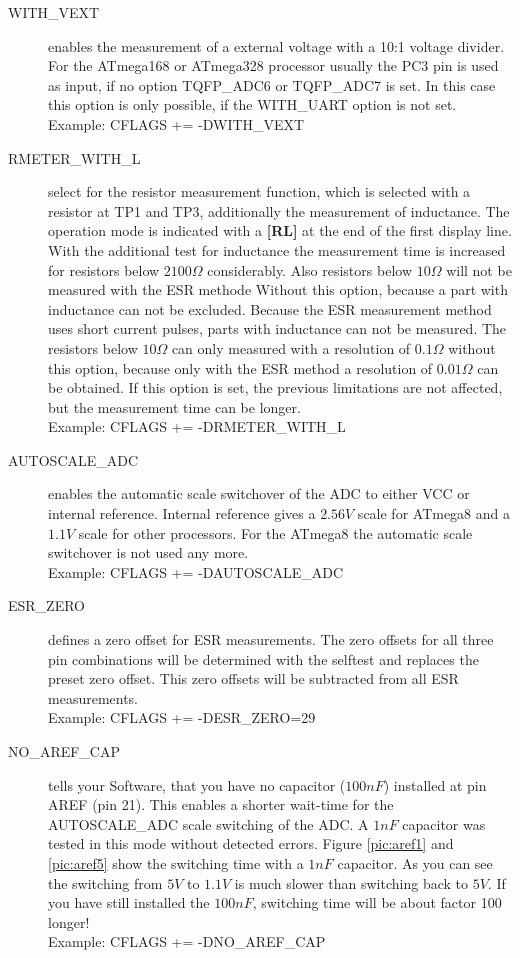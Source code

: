 \begin{description}
  \item[WITH\_VEXT] enables the measurement of a external voltage with a 10:1 voltage divider.
For the ATmega168 or ATmega328 processor usually the PC3 pin is used as input, if no option TQFP\_ADC6 or
TQFP\_ADC7 is set. In this case this option is only possible, if the WITH\_UART option is not set.\\
Example: CFLAGS += -DWITH\_VEXT 

  \item[RMETER\_WITH\_L] select for the resistor measurement function, which is selected with a resistor at TP1 and TP3,
additionally the measurement of inductance. The operation mode is indicated with a {\bf[RL]} at the end of the first display line.
With the additional test for inductance the measurement time is increased for resistors below \(2100\Omega\) considerably.
Also resistors below \(10\Omega\) will not be measured with the ESR methode Without this option, because
a part with inductance can not be excluded. Because the ESR measurement method  uses short current pulses,
parts with inductance can not be measured. The resistors below \(10\Omega\) can only measured with a resolution of
\(0.1\Omega\) without this option, because only with the ESR method a resolution of \(0.01\Omega\) can be obtained.
If this option is set, the previous limitations are not affected, but the measurement time can be longer.\\
Example: CFLAGS += -DRMETER\_WITH\_L

  \item[AUTOSCALE\_ADC] enables the automatic scale switchover of the ADC to either VCC or internal reference.
Internal reference gives a \(2.56V\) scale for ATmega8 and a \(1.1V\) scale for other processors.
For the ATmega8 the automatic scale switchover is not used any more.\\
Example: CFLAGS += -DAUTOSCALE\_ADC

  \item[ESR\_ZERO] defines a zero offset for ESR measurements.
The zero offsets for all three pin combinations will be determined with the selftest and replaces the preset zero offset.
This zero offsets will be subtracted from all ESR measurements.\\
Example: CFLAGS += -DESR\_ZERO=29

  \item[NO\_AREF\_CAP] tells your Software, that you have no capacitor (\(100nF\)) installed at pin AREF (pin 21).
This enables a shorter wait-time for the AUTOSCALE\_ADC scale switching of the ADC.
A \(1nF\) capacitor was tested in this mode without detected errors.
Figure \ref{pic:aref1} and \ref{pic:aref5} show the switching time with a \(1nF\) capacitor.
As you can see the switching from \(5V\) to \(1.1V\) is much slower than switching back to \(5V\). If you
have still installed the \(100nF\), switching time will be about factor 100 longer!\\
Example: CFLAGS += -DNO\_AREF\_CAP


\end{description}
